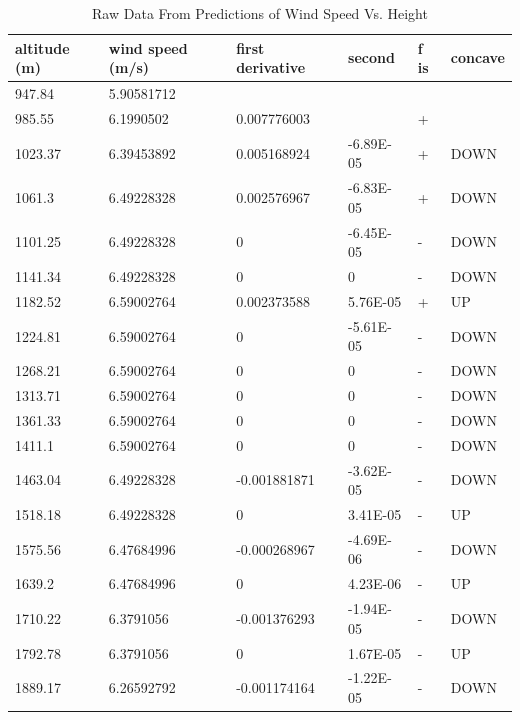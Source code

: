 \documentclass{article}
\begin{document}
\begin{table}
\centering
\caption{Raw Data From Predictions of Wind Speed Vs. Height}
\label{joshtable1}
\begin{tabular}{@{}llllll@{}}
\toprule
altitude (m) & wind speed (m/s) & first derivative & second    & f is & concave \\ \midrule
947.84       & 5.90581712       &                  &           &      &         \\
985.55       & 6.1990502        & 0.007776003      &           & +    &         \\
1023.37      & 6.39453892       & 0.005168924      & -6.89E-05 & +    & DOWN    \\
1061.3       & 6.49228328       & 0.002576967      & -6.83E-05 & +    & DOWN    \\
1101.25      & 6.49228328       & 0                & -6.45E-05 & -    & DOWN    \\
1141.34      & 6.49228328       & 0                & 0         & -    & DOWN    \\
1182.52      & 6.59002764       & 0.002373588      & 5.76E-05  & +    & UP      \\
1224.81      & 6.59002764       & 0                & -5.61E-05 & -    & DOWN    \\
1268.21      & 6.59002764       & 0                & 0         & -    & DOWN    \\
1313.71      & 6.59002764       & 0                & 0         & -    & DOWN    \\
1361.33      & 6.59002764       & 0                & 0         & -    & DOWN    \\
1411.1       & 6.59002764       & 0                & 0         & -    & DOWN    \\
1463.04      & 6.49228328       & -0.001881871     & -3.62E-05 & -    & DOWN    \\
1518.18      & 6.49228328       & 0                & 3.41E-05  & -    & UP      \\
1575.56      & 6.47684996       & -0.000268967     & -4.69E-06 & -    & DOWN    \\
1639.2       & 6.47684996       & 0                & 4.23E-06  & -    & UP      \\
1710.22      & 6.3791056        & -0.001376293     & -1.94E-05 & -    & DOWN    \\
1792.78      & 6.3791056        & 0                & 1.67E-05  & -    & UP      \\
1889.17      & 6.26592792       & -0.001174164     & -1.22E-05 & -    & DOWN    \\

\end{tabular}
\end{table}
\end{document}
